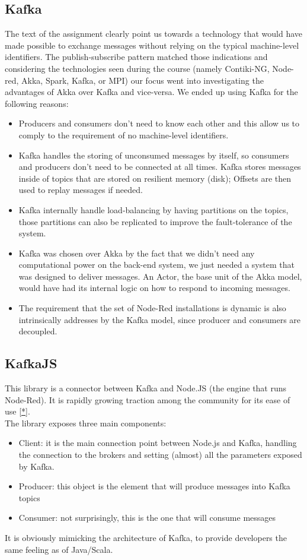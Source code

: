 \documentclass[a4paper, 12pt]{extarticle}
\begin{document}
\subsection{Kafka}\label{kafka}
The text of the assignment clearly point us towards a technology that would have made possible to exchange messages without relying on the typical machine-level identifiers. The publish-subscribe pattern matched those indications and considering the technologies seen during the course (namely Contiki-NG, Node-red, Akka, Spark, Kafka, or MPI) our focus went into investigating the advantages of Akka over Kafka and vice-versa. 
We ended up using Kafka for the following reasons: 
\begin{itemize}
    \item Producers and consumers don't need to know each other and this allow us to comply to the requirement of no machine-level identifiers.
    \item Kafka handles the storing of unconsumed messages by itself, so consumers and producers don't need to be connected at all times. Kafka stores messages inside of topics that are stored on resilient memory (disk); Offsets are then used to replay messages if needed. 
    \item Kafka internally handle load-balancing by having partitions on the topics, those partitions can also be replicated to improve the fault-tolerance of the system.
    \item Kafka was chosen over Akka by the fact that we didn't need any computational power on the back-end system, we just needed a system that was designed to deliver messages. An Actor, the base unit of the Akka model, would have had its internal logic on how to respond to incoming messages.
    \item The requirement that the set of Node-Red installations is dynamic is also intrinsically addresses by the Kafka model, since producer and consumers are decoupled. 
\end{itemize}

\subsection{KafkaJS}\label{kafkajs}
This library is a connector between Kafka and Node.JS (the engine that runs Node-Red). It is rapidly growing traction among the community for its ease of use \href{https://github.com/tulios/kafkajs/issues/289}{[*]}.
\\
The library exposes three main components:
\begin{itemize}
    \item Client: it is the main connection point between Node.js and Kafka, handling the connection to the brokers and setting (almost) all the parameters exposed by Kafka. 
    \item Producer: this object is the element that will produce messages into Kafka topics
    \item Consumer: not surprisingly, this is the one that will consume messages
\end{itemize}
It is obviously mimicking the architecture of Kafka, to provide developers the same feeling as of Java/Scala.
\end{document}

